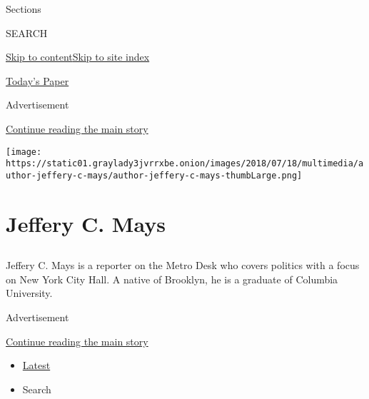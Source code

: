 Sections

SEARCH

\protect\hyperlink{site-content}{Skip to
content}\protect\hyperlink{site-index}{Skip to site index}

\href{https://myaccount.nytimes3xbfgragh.onion/auth/login?response_type=cookie\&client_id=vi}{}

\href{https://www.nytimes3xbfgragh.onion/section/todayspaper}{Today's
Paper}

Advertisement

\protect\hyperlink{after-top}{Continue reading the main story}

\texttt{[image: https://static01.graylady3jvrrxbe.onion/images/2018/07/18/multimedia/author-jeffery-c-mays/author-jeffery-c-mays-thumbLarge.png]}

\hypertarget{jeffery-c-mays}{%
\section{Jeffery C. Mays}\label{jeffery-c-mays}}

\subsection{}

Jeffery C. Mays is a reporter on the Metro Desk who covers politics with
a focus on New York City Hall. A native of Brooklyn, he is a graduate of
Columbia University.

Advertisement

\protect\hyperlink{after-mid1}{Continue reading the main story}

\begin{itemize}
\tightlist
\item
  \protect\hyperlink{stream-panel}{Latest}
\item
  Search
\end{itemize}

